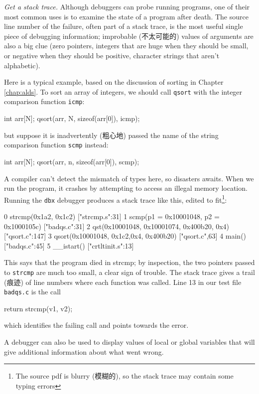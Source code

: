 \emph{Get a stack trace.} Although debuggers can probe running programs,
one of their most common uses is to examine the state of a program after
death. The source line number of the failure, often part of a stack trace,
is the most useful single piece of debugging information; improbable
(不太可能的) values of arguments are also a big clue (zero pointers,
integers that are huge when they should be small, or negative when they
should be positive, character strings that aren't alphabetic).

Here is a typical example, based on the discussion of sorting in Chapter
\ref{chap:alds}. To sort an array of integers, we should call \verb'qsort'
with the integer comparison function \verb'icmp':
\begin{wellcode}
    int arr[N];
    qsort(arr, N, sizeof(arr[0]), icmp);
\end{wellcode}
but suppose it is inadvertently (粗心地) passed the name of the string
comparison function \verb'scmp' instead:
\begin{badcode}
    int arr[N];
    qsort(arr, n, sizeof(arr[0]), scmp);
\end{badcode}
A compiler can't detect the mismatch of types here, so disasters awaits.
When we run the program, it crashes by attempting to access an illegal
memory location. Running the \verb'dbx' debugger produces a stack trace
like this, edited to fit\footnote{The source pdf is blurry (模糊的), so the
    stack trace may contain some typing errors}:
\begin{wellcode}
    0 strcmp(0x1a2, 0x1c2) ["strcmp.s":31]
    1 scmp(p1 = 0x10001048, p2 = 0x1000105c) ["badqs.c":31]
    2 qst(0x10001048, 0x10001074, 0x400b20, 0x4) ["qsort.c":147]
    3 qsort(0x10001048, 0x1c2,0x4, 0x400b20) ["qsort.c",63]
    4 main() ["badqs.c":45]
    5 __istart() ["crtltinit.s":13]
\end{wellcode}
This says that the program died in strcmp; by inspection, the two pointers
passed to \verb'strcmp' are much too small, a clear sign of trouble. The
stack trace gives a trail (痕迹) of line numbers where each function was
called. Line 13 in our test file \verb'badqs.c' is the call 
\begin{wellcode}
    return strcmp(v1, v2);
\end{wellcode}
which identifies the failing call and points towards the error.

A debugger can also be used to display values of local or global variables
that will give additional information about what went wrong.

